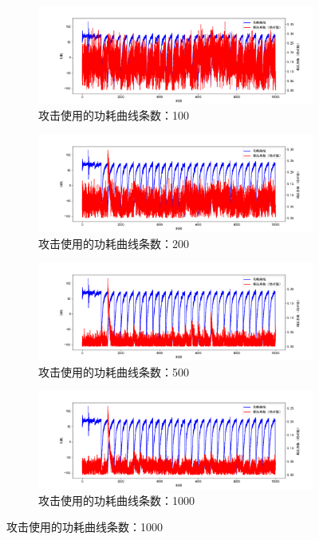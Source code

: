 \begin{figure}[htbp]
    \centering

    \begin{subfigure}{1.0\textwidth}
        \includegraphics[height=.21\textheight, width=1.0\textwidth]{../images/leakage_100.png}
        \caption{攻击使用的功耗曲线条数：100}
    \end{subfigure}
    \begin{subfigure}{1.0\textwidth}
        \includegraphics[height=.21\textheight, width=1.0\textwidth]{../images/leakage_200.png}
        \caption{攻击使用的功耗曲线条数：200}
    \end{subfigure}
    \begin{subfigure}{1.0\textwidth}
        \includegraphics[height=.21\textheight, width=1.0\textwidth]{../images/leakage_500.png}
        \caption{攻击使用的功耗曲线条数：500}
    \end{subfigure}
    \begin{subfigure}{1.0\textwidth}
        \includegraphics[height=.21\textheight, width=1.0\textwidth]{../images/leakage_1000.png}
        \caption{攻击使用的功耗曲线条数：1000}
    \end{subfigure}


\end{figure}
